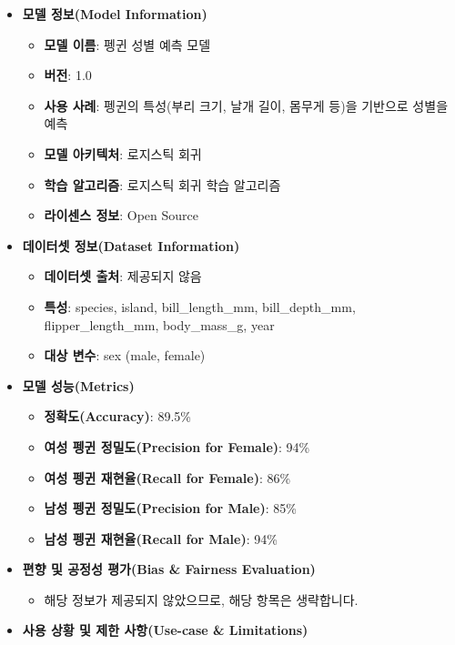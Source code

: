 \documentclass[
  letterpaper,
  chapter,a4paper,showtrims,openright,hidelinks]{oblivoir}
\providecommand{\tightlist}{%
  \setlength{\itemsep}{0pt}\setlength{\parskip}{0pt}}\usepackage{longtable,booktabs,array}
\begin{document}
\begin{itemize}
\tightlist
\item
  \textbf{모델 정보(Model Information)}

  \begin{itemize}
  \tightlist
  \item
    \textbf{모델 이름}: 펭귄 성별 예측 모델
  \item
    \textbf{버전}: 1.0
  \item
    \textbf{사용 사례}: 펭귄의 특성(부리 크기, 날개 길이, 몸무게 등)을
    기반으로 성별을 예측
  \item
    \textbf{모델 아키텍처}: 로지스틱 회귀
  \item
    \textbf{학습 알고리즘}: 로지스틱 회귀 학습 알고리즘
  \item
    \textbf{라이센스 정보}: Open Source
  \end{itemize}
\item
  \textbf{데이터셋 정보(Dataset Information)}

  \begin{itemize}
  \tightlist
  \item
    \textbf{데이터셋 출처}: 제공되지 않음
  \item
    \textbf{특성}: species, island, bill\_length\_mm, bill\_depth\_mm,
    flipper\_length\_mm, body\_mass\_g, year
  \item
    \textbf{대상 변수}: sex (male, female)
  \end{itemize}
\item
  \textbf{모델 성능(Metrics)}

  \begin{itemize}
  \tightlist
  \item
    \textbf{정확도(Accuracy)}: 89.5\%
  \item
    \textbf{여성 펭귄 정밀도(Precision for Female)}: 94\%
  \item
    \textbf{여성 펭귄 재현율(Recall for Female)}: 86\%
  \item
    \textbf{남성 펭귄 정밀도(Precision for Male)}: 85\%
  \item
    \textbf{남성 펭귄 재현율(Recall for Male)}: 94\%
  \end{itemize}
\item
  \textbf{편향 및 공정성 평가(Bias \& Fairness Evaluation)}

  \begin{itemize}
  \tightlist
  \item
    해당 정보가 제공되지 않았으므로, 해당 항목은 생략합니다.
  \end{itemize}
\item
  \textbf{사용 상황 및 제한 사항(Use-case \& Limitations)}


\end{itemize}
\end{document}
